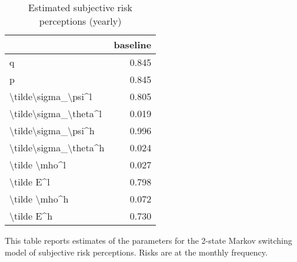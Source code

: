 
\begin{table}[p]
\centering
\begin{adjustbox}{width=0.3\textwidth}
\begin{threeparttable}
\caption{Estimated subjective risk perceptions (yearly)}
\label{tab:PRMarkovEst}\begin{tabular}{lr}
\toprule
{} &  baseline \\
\midrule
q                     &     0.845 \\
p                     &     0.845 \\
\textbackslash tilde\textbackslash sigma\_\textbackslash psi\textasciicircum l   &     0.805 \\
\textbackslash tilde\textbackslash sigma\_\textbackslash theta\textasciicircum l &     0.019 \\
\textbackslash tilde\textbackslash sigma\_\textbackslash psi\textasciicircum h   &     0.996 \\
\textbackslash tilde\textbackslash sigma\_\textbackslash theta\textasciicircum h &     0.024 \\
\textbackslash tilde \textbackslash mho\textasciicircum l         &     0.027 \\
\textbackslash tilde E\textasciicircum l            &     0.798 \\
\textbackslash tilde \textbackslash mho\textasciicircum h         &     0.072 \\
\textbackslash tilde E\textasciicircum h            &     0.730 \\
\bottomrule
\end{tabular}
\begin{tablenotes}\item This table reports estimates of the parameters 
for the 2-state Markov switching model of subjective risk perceptions. Risks are at the monthly frequency. 
\end{tablenotes}
\end{threeparttable}
\end{adjustbox}
\end{table}